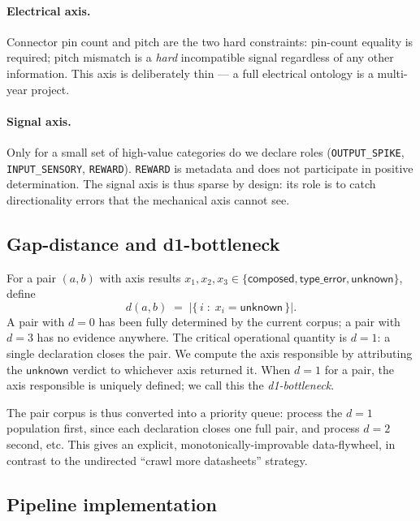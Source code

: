 \documentclass[11pt,twocolumn]{article}
\begin{document}
\paragraph{Electrical axis.}
Connector pin count and pitch are the two hard constraints: pin-count
equality is required; pitch mismatch is a \emph{hard} incompatible
signal regardless of any other information. This axis is deliberately
thin — a full electrical ontology is a multi-year project.

\paragraph{Signal axis.}
Only for a small set of high-value categories do we declare roles
(\texttt{OUTPUT\_SPIKE}, \texttt{INPUT\_SENSORY}, \texttt{REWARD}).
\texttt{REWARD} is metadata and does not participate in positive
determination. The signal axis is thus sparse by design: its role is
to catch directionality errors that the mechanical axis cannot see.

\subsection{Gap-distance and d1-bottleneck}

For a pair $(a, b)$ with axis results $x_1, x_2, x_3 \in
\{\mathsf{composed}, \mathsf{type\_error}, \mathsf{unknown}\}$,
define
\begin{equation}
  d(a, b) \;=\; |\{\, i \;:\; x_i = \mathsf{unknown}\,\}|.
  \label{eq:gapd}
\end{equation}
A pair with $d=0$ has been fully determined by the current corpus;
a pair with $d=3$ has no evidence anywhere. The critical
operational quantity is $d=1$: a single declaration closes the pair.
We compute the axis responsible by attributing the $\mathsf{unknown}$
verdict to whichever axis returned it. When $d=1$ for a pair, the
axis responsible is uniquely defined; we call this the
\emph{d1-bottleneck}.

The pair corpus is thus converted into a priority queue: process
the $d=1$ population first, since each declaration closes one full
pair, and process $d=2$ second, etc. This gives an explicit,
monotonically-improvable data-flywheel, in contrast to the
undirected ``crawl more datasheets'' strategy.

\subsection{Pipeline implementation}
\end{document}
